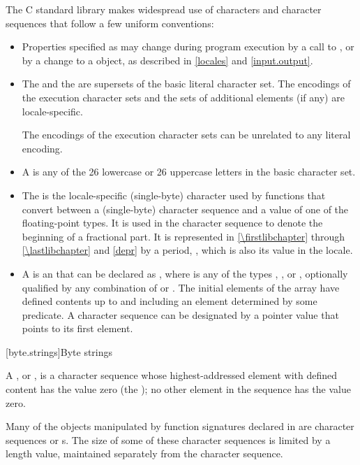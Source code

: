 \pnum
The C standard library makes widespread use
%
of characters and character sequences that follow a few uniform conventions:
\begin{itemize}
\item
Properties specified as 
may change during program execution
by a call to , or
by a change to a  object,
as described in \ref{locales} and \ref{input.output}.
\item
The  and
the 
are supersets of the basic literal character set.
The encodings of the execution character sets and
the sets of additional elements (if any) are locale-specific.
\begin{note}
The encodings of the execution character sets can be unrelated
to any literal encoding.
\end{note}
\item
A  is any of the 26 lowercase or 26
%
%
uppercase letters in the basic character set.
\item
The
is the locale-specific
(single-byte) character used by functions that convert between a (single-byte)
character sequence and a value of one of the floating-point types.
It is used
in the character sequence to denote the beginning of a fractional part.
It is
represented in \ref{\firstlibchapter} through \ref{\lastlibchapter}
and \ref{depr} by a period,
%
,
which is
also its value in the 
locale.
\item
A
is an   that
can be declared as
,
where  is any of the types
,
,
or
, optionally qualified by any combination of
or
.
The initial elements of the
array have defined contents up to and including an element determined by some
predicate.
A character sequence can be designated by a pointer value
 that points to its first element.
\end{itemize}

[byte.strings]{Byte strings}

%
\pnum
A ,
or \ntbs{},
is a character sequence whose highest-addressed element
with defined content has the value zero
(the );
no other element in the sequence has the value zero.
\begin{footnote}
Many of the objects manipulated by
function signatures declared in
 are character sequences or \ntbs{}s.
The size of some of these character sequences is limited by
a length value, maintained separately from the character sequence.
\end{footnote}

